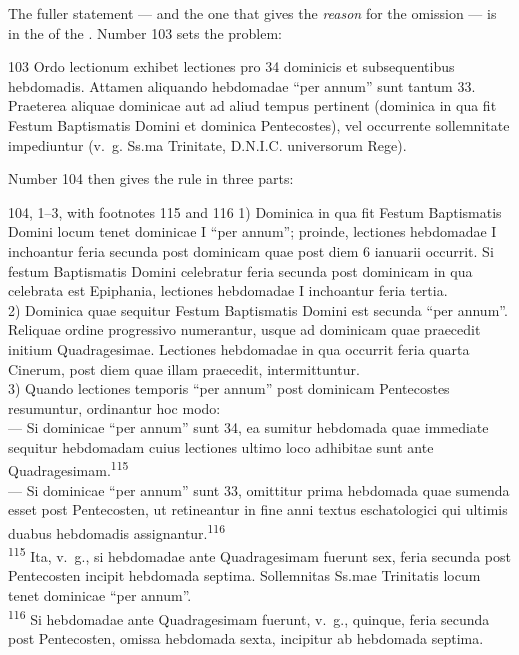 The fuller statement --- and the one that gives the \emph{reason} for the omission --- is in the
 of the . Number 103 sets the problem:

\begin{normtext}{  103}
Ordo lectionum exhibet lectiones pro 34 dominicis et subsequentibus hebdomadis. Attamen aliquando
hebdomadae ``per annum'' sunt tantum 33. Praeterea aliquae dominicae aut ad aliud tempus pertinent
(dominica in qua fit Festum Baptismatis Domini et dominica Pentecostes), vel occurrente sollemnitate
impediuntur (v.~g. Ss.ma Trinitate, D.N.I.C. universorum Rege).
\end{normtext}

Number 104 then gives the rule in three parts:

\begin{normtext}{  104, 1--3, with footnotes 115 and 116}
1) Dominica in qua fit Festum Baptismatis Domini locum tenet dominicae I ``per annum''; proinde,
lectiones hebdomadae I inchoantur feria secunda post dominicam quae post diem 6 ianuarii occurrit.
Si festum Baptismatis Domini celebratur feria secunda post dominicam in qua celebrata est Epiphania,
lectiones hebdomadae I inchoantur feria tertia.\\
2) Dominica quae sequitur Festum Baptismatis Domini est secunda ``per annum''. Reliquae ordine
progressivo numerantur, usque ad dominicam quae praecedit initium Quadragesimae. Lectiones
hebdomadae in qua occurrit feria quarta Cinerum, post diem quae illam praecedit, intermittuntur.\\
3) Quando lectiones temporis ``per annum'' post dominicam Pentecostes resumuntur, ordinantur hoc
modo:\\
--- Si dominicae ``per annum'' sunt 34, ea sumitur hebdomada quae immediate sequitur hebdomadam
cuius lectiones ultimo loco adhibitae sunt ante Quadragesimam.\textsuperscript{115}\\
--- Si dominicae ``per annum'' sunt 33, omittitur prima hebdomada quae sumenda esset post
Pentecosten, ut retineantur in fine anni textus eschatologici qui ultimis duabus hebdomadis
assignantur.\textsuperscript{116}\\[0.35em]
\textsuperscript{115} Ita, v.~g., si hebdomadae ante Quadragesimam fuerunt sex, feria secunda post
Pentecosten incipit hebdomada septima. Sollemnitas Ss.mae Trinitatis locum tenet dominicae ``per
annum''.\\
\textsuperscript{116} Si hebdomadae ante Quadragesimam fuerunt, v.~g., quinque, feria secunda post
Pentecosten, omissa hebdomada sexta, incipitur ab hebdomada septima.
\end{normtext}

